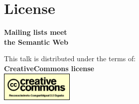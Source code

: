 \documentclass[spanish,notes=hide,16pt]{beamer}
\begin{document}
\section{License}
\frame
{
  \begin{center}
    \LARGE{\textbf{Mailing lists meet\\the Semantic Web}}\\
    \vspace{1cm}
    \vspace{1cm}
    \begin{tiny}
	This talk is distributed under the terms of:\\
	\textbf{CreativeCommons license}\\
	\includegraphics[width=3.5cm]{images/creativecommons.png}
    \end{tiny}
  \end{center}
}
\end{document}
